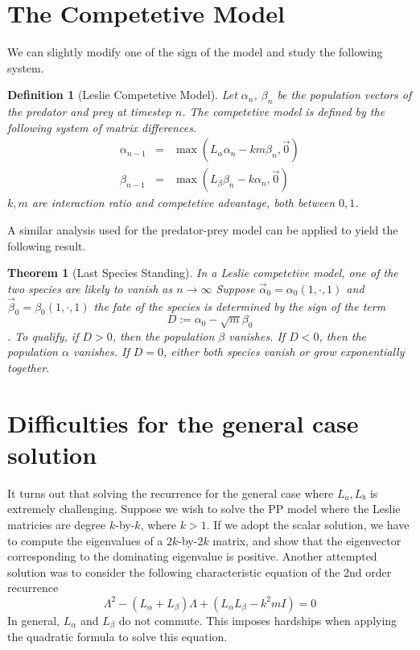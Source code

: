 \documentclass{article}
\newtheorem{theorem}{Theorem}
\newtheorem{definition}{Definition}
\begin{document}
\section{The Competetive Model}
We can slightly modify one of the sign of the model and 
study the following system. 
\begin{definition}[Leslie Competetive Model]
Let $\alpha_n$, $\beta_n$ be the population vectors 
of the predator and prey at timestep $n$. The competetive 
model is defined by the following 
system of matrix differences. 
\begin{eqnarray}
    \alpha_{n - 1} &=& \max(L_\alpha \alpha_n - k m \beta_n, \vec 0) \\ 
    \beta_{n - 1} &=& \max(L_\beta \beta_n - k \alpha_n, \vec 0) \nonumber
\end{eqnarray}
$k, m$ are interaction ratio and competetive advantage, both between $0, 1$. 
\end{definition}

A similar analysis used for the predator-prey model 
can be applied to yield the following result. 

\begin{theorem}[Last Species Standing]
    In a Leslie competetive model, one of the two 
    species are likely to vanish as $n \rightarrow \infty$ 
    Suppose $\vec \alpha_0 = \alpha_0 (1, \cdot, 1)$ and 
    $\vec \beta_0 = \beta_0 (1, \cdot, 1)$
    the fate of the species is determined 
    by the sign of the term 
    \[
        D := \alpha_0 - \sqrt{m} \beta_0
    \]
    . To qualify, if $D > 0$, then the population $\beta$ 
    vanishes. If $D < 0$, then the population $\alpha$ vanishes. 
    If $D = 0$, either both species vanish or grow exponentially together. 
\end{theorem}



\section{Difficulties for the general case solution}


It turns out that solving the recurrence for the general case 
where $L_a, L_b$ is extremely challenging. Suppose we wish to 
solve the PP model where the Leslie matricies are degree $k$-by-$k$, 
where $k > 1$. If we adopt the scalar solution, we have to compute 
the eigenvalues of a $2k$-by-$2k$ matrix, and show that the eigenvector 
corresponding to the dominating eigenvalue is positive. Another 
attempted solution was to consider the following characteristic equation of 
the 2nd order recurrence
\[
    \Lambda^2 - (L_\alpha + L_\beta) \Lambda + (L_\alpha L_\beta - k^2 m I) = 0
\]
In general, $L_\alpha$ and $L_\beta$ do not commute. This imposes 
hardships when applying the quadratic formula to solve this equation.
\end{document}
